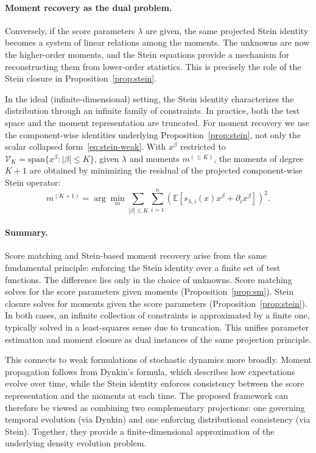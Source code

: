 \documentclass{article}
\newcommand{\E}{\mathbb{E}}
\theoremstyle{definition}
\begin{document}
\paragraph{Moment recovery as the dual problem.}
Conversely, if the score parameters $\lambda$ are given, the same projected Stein identity becomes a system of linear relations among the moments. The unknowns are now the higher-order moments, and the Stein equations provide a mechanism for reconstructing them from lower-order statistics. This is precisely the role of the Stein closure in Proposition~\ref{prop:stein}.

In the ideal (infinite-dimensional) setting, the Stein identity characterizes the distribution through an infinite family of constraints. In practice, both the test space and the moment representation are truncated. For moment recovery we use the component-wise identities underlying Proposition~\ref{prop:stein}, not only the scalar collapsed form~\eqref{eq:stein-weak}. With $x^\beta$ restricted to $\mathcal{V}_K = \mathrm{span}\{x^\beta : |\beta| \le K\}$, given $\lambda$ and moments $m^{(\le K)}$, the moments of degree $K{+}1$ are obtained by minimizing the residual of the projected component-wise Stein operator:
\[
    m^{(K+1)} = \arg\min_{m} \sum_{|\beta| \le K}\sum_{i=1}^n
    \left( \E\!\left[ s_{\lambda,i}(x)x^\beta + \partial_i x^\beta \right] \right)^2.
\]

\paragraph{Summary.}
Score matching and Stein-based moment recovery arise from the same fundamental principle: enforcing the Stein identity over a finite set of test functions. The difference lies only in the choice of unknowns. Score matching solves for the score parameters given moments (Proposition~\ref{prop:sm}). Stein closure solves for moments given the score parameters (Proposition~\ref{prop:stein}). In both cases, an infinite collection of constraints is approximated by a finite one, typically solved in a least-squares sense due to truncation. This unifies parameter estimation and moment closure as dual instances of the same projection principle.

This connects to weak formulations of stochastic dynamics more broadly. Moment propagation follows from Dynkin's formula, which describes how expectations evolve over time, while the Stein identity enforces consistency between the score representation and the moments at each time. The proposed framework can therefore be viewed as combining two complementary projections: one governing temporal evolution (via Dynkin) and one enforcing distributional consistency (via Stein). Together, they provide a finite-dimensional approximation of the underlying density evolution problem.
\end{document}
